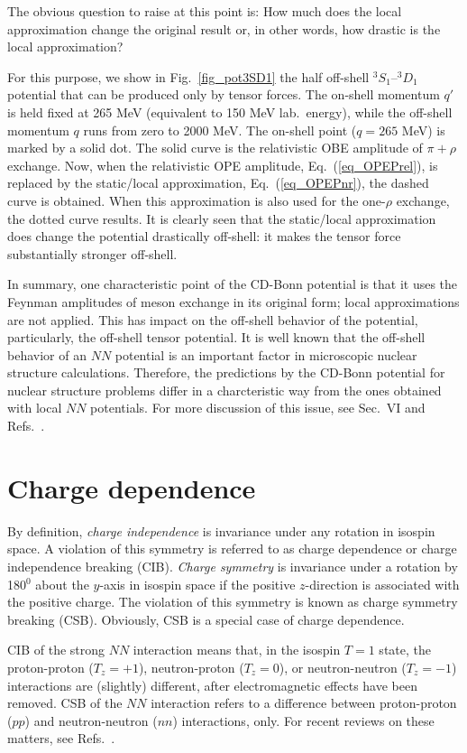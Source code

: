 The obvious question to raise at this point is: How much does
the local approximation change the original result or, in other
words, how drastic is the local approximation?

For this purpose, we show in
Fig.~\ref{fig_pot3SD1} the half off-shell
$^3S_1$--$^3D_1$
potential that can be produced only by tensor forces.
The on-shell momentum $q'$ is held fixed at 265 MeV
(equivalent to 150 MeV lab.\ energy),
while the off-shell momentum $q$ runs from zero
to 2000 MeV.
The on-shell point ($q=265$ MeV) is marked by a solid dot.
The solid curve is the relativistic OBE amplitude of $\pi
+ \rho$ exchange.
Now, when the relativistic
OPE amplitude, Eq.~(\ref{eq_OPEPrel}), is replaced by the static/local
approximation, Eq.~(\ref{eq_OPEPnr}),
the dashed curve is obtained.
When this approximation is also used for the one-$\rho$
exchange, the dotted curve results.
It is clearly seen that the static/local approximation
does change the potential drastically off-shell:
it makes the tensor force substantially stronger off-shell.

In summary, one characteristic point of the CD-Bonn potential is
that it uses the Feynman amplitudes of meson exchange
in its original form; local approximations are not applied.
This has impact on the off-shell behavior of the potential,
particularly, the off-shell tensor potential. It is well known that
the off-shell behavior of an $NN$ potential is an important
factor in microscopic nuclear structure calculations. 
Therefore, the predictions by the CD-Bonn potential 
for nuclear structure problems differ in a charcteristic way from 
the ones obtained with local $NN$ potentials.
For more discussion of this issue, see Sec.~VI and Refs.~\cite{MSS96,Mac98}.


\section{Charge dependence}


By definition, {\it charge independence} is invariance under any 
rotation in isospin space. 
A violation of this symmetry is referred to as charge dependence
or charge independence breaking (CIB).
{\it Charge symmetry} is invariance under a rotation by 180$^0$ about the
$y$-axis in isospin space if the positive $z$-direction is associated
with the positive charge.
The violation of this symmetry is known as charge symmetry breaking (CSB).
Obviously, CSB is a special case of charge dependence.

CIB of the strong $NN$ interaction means that,
in the isospin $T=1$ state, the
proton-proton ($T_z=+1$), 
neutron-proton ($T_z=0$),
or neutron-neutron ($T_z=-1$)
interactions are (slightly) different,
after electromagnetic effects have been removed.
CSB of the $NN$ interaction refers to a difference
between proton-proton ($pp$) and neutron-neutron ($nn$)
interactions, only. 
For recent reviews on these matters, see Refs.~\cite{MO95,MNS90}.

